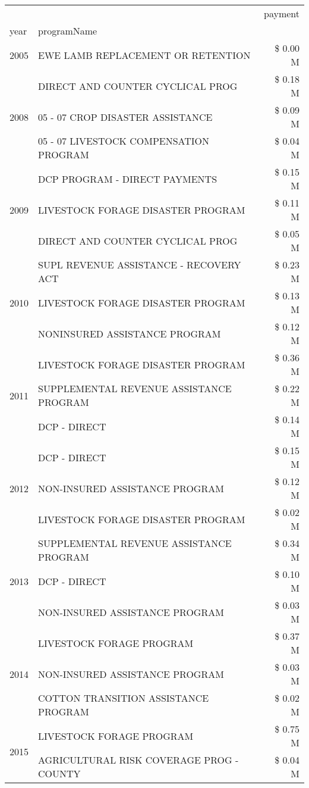 \begin{tabular}{llr}
\toprule
 &  & payment \\
year & programName &  \\
\midrule
2005 & EWE LAMB REPLACEMENT OR RETENTION & \$ 0.00 M \\
\cline{1-3}
\multirow[t]{3}{*}{2008} & DIRECT AND COUNTER CYCLICAL PROG & \$ 0.18 M \\
 & 05 - 07 CROP DISASTER ASSISTANCE & \$ 0.09 M \\
 & 05 - 07 LIVESTOCK COMPENSATION PROGRAM & \$ 0.04 M \\
\cline{1-3}
\multirow[t]{3}{*}{2009} & DCP PROGRAM - DIRECT PAYMENTS & \$ 0.15 M \\
 & LIVESTOCK FORAGE DISASTER  PROGRAM & \$ 0.11 M \\
 & DIRECT AND COUNTER CYCLICAL PROG & \$ 0.05 M \\
\cline{1-3}
\multirow[t]{3}{*}{2010} & SUPL REVENUE ASSISTANCE - RECOVERY ACT & \$ 0.23 M \\
 & LIVESTOCK FORAGE DISASTER PROGRAM & \$ 0.13 M \\
 & NONINSURED ASSISTANCE PROGRAM & \$ 0.12 M \\
\cline{1-3}
\multirow[t]{3}{*}{2011} & LIVESTOCK FORAGE DISASTER PROGRAM & \$ 0.36 M \\
 & SUPPLEMENTAL REVENUE ASSISTANCE PROGRAM & \$ 0.22 M \\
 & DCP - DIRECT & \$ 0.14 M \\
\cline{1-3}
\multirow[t]{3}{*}{2012} & DCP - DIRECT & \$ 0.15 M \\
 & NON-INSURED ASSISTANCE PROGRAM & \$ 0.12 M \\
 & LIVESTOCK FORAGE DISASTER PROGRAM & \$ 0.02 M \\
\cline{1-3}
\multirow[t]{3}{*}{2013} & SUPPLEMENTAL REVENUE ASSISTANCE PROGRAM & \$ 0.34 M \\
 & DCP - DIRECT & \$ 0.10 M \\
 & NON-INSURED ASSISTANCE PROGRAM & \$ 0.03 M \\
\cline{1-3}
\multirow[t]{3}{*}{2014} & LIVESTOCK FORAGE PROGRAM & \$ 0.37 M \\
 & NON-INSURED ASSISTANCE PROGRAM & \$ 0.03 M \\
 & COTTON TRANSITION ASSISTANCE PROGRAM & \$ 0.02 M \\
\cline{1-3}
\multirow[t]{3}{*}{2015} & LIVESTOCK FORAGE PROGRAM & \$ 0.75 M \\
 & AGRICULTURAL RISK COVERAGE PROG - COUNTY & \$ 0.04 M \\

\end{tabular}
